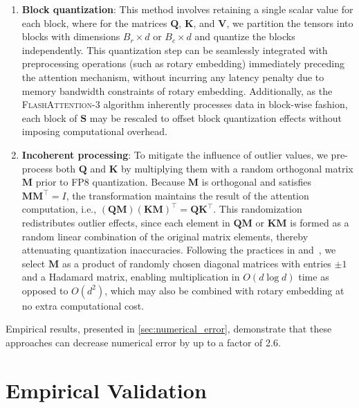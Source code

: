 \begin{enumerate}

\item \textbf{Block quantization}: This method involves retaining a single scalar value for each block, where for the matrices $\mathbf{Q}$, $\mathbf{K}$, and $\mathbf{V}$, we partition the tensors into blocks with dimensions $B_r \times d$ or $B_c \times d$ and quantize the blocks independently. This quantization step can be seamlessly integrated with preprocessing operations (such as rotary embedding) immediately preceding the attention mechanism, without incurring any latency penalty due to memory bandwidth constraints of rotary embedding. Additionally, as the \textsc{FlashAttention-3} algorithm inherently processes data in block-wise fashion, each block of $\mathbf{S}$ may be rescaled to offset block quantization effects without imposing computational overhead.

\item \textbf{Incoherent processing}: To mitigate the influence of outlier values, we pre-process both $\mathbf{Q}$ and $\mathbf{K}$ by multiplying them with a random orthogonal matrix $\mathbf{M}$ prior to FP8 quantization. Because $\mathbf{M}$ is orthogonal and satisfies $\mathbf{M} \mathbf{M}^\top = I$, the transformation maintains the result of the attention computation, i.e., $(\mathbf{Q} \mathbf{M}) (\mathbf{K} \mathbf{M})^\top = \mathbf{Q} \mathbf{K}^\top$. This randomization redistributes outlier effects, since each element in $\mathbf{Q}\mathbf{M}$ or $\mathbf{K}\mathbf{M}$ is formed as a random linear combination of the original matrix elements, thereby attenuating quantization inaccuracies. Following the practices in \citet{chee2024quip} and~\citet{tseng2024quip}, we select $\mathbf{M}$ as a product of randomly chosen diagonal matrices with entries $\pm 1$ and a Hadamard matrix, enabling multiplication in $O(d \log d)$ time as opposed to $O(d^2)$, which may also be combined with rotary embedding at no extra computational cost.

\end{enumerate}

Empirical results, presented in \cref{sec:numerical_error}, demonstrate that these approaches can decrease numerical error by up to a factor of 2.6.

\section{Empirical Validation}
\label{sec:exp}

